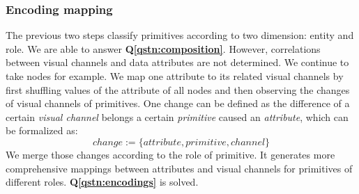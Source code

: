 \subsubsection{Encoding mapping}\label{sec:encodingmapping}
The previous two steps classify primitives according to two dimension: entity and role.
We are able to answer \textbf{Q\ref{qstn:composition}}.
However, correlations between visual channels and data attributes are not determined.
We continue to take nodes for example.
We map one attribute to its related visual channels by first shuffling values of the attribute of all nodes and then observing the changes of visual channels of primitives.
One change can be defined as the difference of a certain \textit{visual channel} belongs a certain \textit{primitive} caused an \textit{attribute}, which can be formalized as:
\begin{equation}
    change := \{ attribute, primitive, channel \}
\end{equation}
We merge those changes according to the role of primitive.
It generates more comprehensive mappings between attributes and visual channels for primitives of different roles.
\textbf{Q\ref{qstn:encodings}} is solved.


